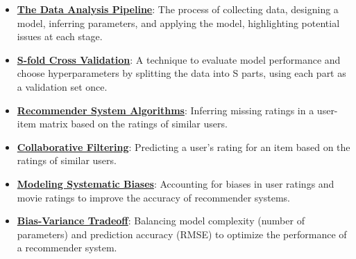 \documentclass{article}%
\begin{document}
\begin{itemize}[leftmargin=*]
\item \href{https://purdue.brightspace.com/d2l/common/assets/pdfjs-d2l-dist/1.0.14-legacy/web/viewer.html?file=%2Fcontent%2Fenforced%2F1095467-wl.202510.CS.24300.001%2F10L1-CrossValidation.pdf%3Fou%3D1095467&lang=en-us&container=d2l-fileviewer-rendered-pdf&fullscreen=d2l-fileviewer-rendered-pdf-dialog&height=667#page=26}{\textbf{The Data Analysis Pipeline}}: The process of collecting data, designing a model, inferring parameters, and applying the model, highlighting potential issues at each stage.%
\item \href{https://purdue.brightspace.com/d2l/common/assets/pdfjs-d2l-dist/1.0.14-legacy/web/viewer.html?file=%2Fcontent%2Fenforced%2F1095467-wl.202510.CS.24300.001%2F10L1-CrossValidation.pdf%3Fou%3D1095467&lang=en-us&container=d2l-fileviewer-rendered-pdf&fullscreen=d2l-fileviewer-rendered-pdf-dialog&height=667#page=25}{\textbf{S-fold Cross Validation}}: A technique to evaluate model performance and choose hyperparameters by splitting the data into S parts, using each part as a validation set once.%
\item \href{https://purdue.brightspace.com/d2l/common/assets/pdfjs-d2l-dist/1.0.14-legacy/web/viewer.html?file=%2Fcontent%2Fenforced%2F1095467-wl.202510.CS.24300.001%2F11L2-svd-pca-recommender.pdf%3Fou%3D1095467&lang=en-us&container=d2l-fileviewer-rendered-pdf&fullscreen=d2l-fileviewer-rendered-pdf-dialog&height=667#page=31}{\textbf{Recommender System Algorithms}}: Inferring missing ratings in a user-item matrix based on the ratings of similar users.%
\item \href{https://purdue.brightspace.com/d2l/common/assets/pdfjs-d2l-dist/1.0.14-legacy/web/viewer.html?file=%2Fcontent%2Fenforced%2F1095467-wl.202510.CS.24300.001%2F11L2-svd-pca-recommender.pdf%3Fou%3D1095467&lang=en-us&container=d2l-fileviewer-rendered-pdf&fullscreen=d2l-fileviewer-rendered-pdf-dialog&height=667#page=33}{\textbf{Collaborative Filtering}}: Predicting a user's rating for an item based on the ratings of similar users.%
\item \href{https://purdue.brightspace.com/d2l/common/assets/pdfjs-d2l-dist/1.0.14-legacy/web/viewer.html?file=%2Fcontent%2Fenforced%2F1095467-wl.202510.CS.24300.001%2F11L2-svd-pca-recommender.pdf%3Fou%3D1095467&lang=en-us&container=d2l-fileviewer-rendered-pdf&fullscreen=d2l-fileviewer-rendered-pdf-dialog&height=667#page=40}{\textbf{Modeling Systematic Biases}}: Accounting for biases in user ratings and movie ratings to improve the accuracy of recommender systems.%
\item \href{https://purdue.brightspace.com/d2l/common/assets/pdfjs-d2l-dist/1.0.14-legacy/web/viewer.html?file=%2Fcontent%2Fenforced%2F1095467-wl.202510.CS.24300.001%2F11L2-svd-pca-recommender.pdf%3Fou%3D1095467&lang=en-us&container=d2l-fileviewer-rendered-pdf&fullscreen=d2l-fileviewer-rendered-pdf-dialog&height=667#page=53}{\textbf{Bias-Variance Tradeoff}}: Balancing model complexity (number of parameters) and prediction accuracy (RMSE) to optimize the performance of a recommender system.%

\end{itemize}
\end{document}
